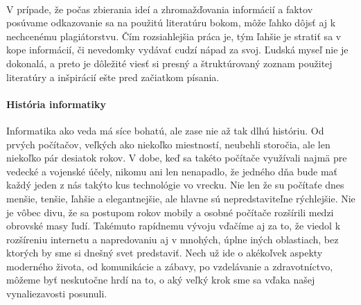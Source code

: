 \documentclass[10pt,twoside,slovak,a4paper]{article}
\begin{document}
\paragraph{} V prípade, že počas zbierania ideí a zhromažďovania informácií a faktov posúvame odkazovanie sa na použitú literatúru bokom, môže ľahko dôjsť aj k nechcenému plagiátorstvu. Čím rozsiahlejšia práca je, tým ľahšie je stratiť sa v kope informácií, či nevedomky vydávať cudzí nápad za svoj. Ľudská myseľ nie je dokonalá, a preto je dôležité viesť si presný a štruktúrovaný zoznam použitej literatúry a inšpirácií ešte pred začiatkom písania.

\paragraph{História informatiky} Informatika ako veda má síce bohatú, ale zase nie až tak dlhú históriu. Od prvých počítačov, veľkých ako niekoľko miestností, neubehli storočia, ale len niekoľko pár desiatok rokov. V dobe, keď sa takéto počítače využívali najmä pre vedecké a vojenské účely, nikomu ani len nenapadlo, že jedného dňa bude mať každý jeden z nás takýto kus technológie vo vrecku. Nie len že su počítaťe dnes menšie, tenšie, ľahšie a elegantnejšie, ale hlavne sú nepredstaviteľne rýchlejšie. Nie je vôbec divu, že sa postupom rokov mobily a osobné počítače rozšírili medzi obrovské masy ľudí. Takémuto rapídnemu vývoju vďačíme aj za to, že viedol k rozšíreniu internetu a napredovaniu aj v mnohých, úplne iných oblastiach, bez ktorých by sme si dnešný svet predstaviť. Nech už ide o akékoľvek aspekty moderného života, od komunikácie a zábavy, po vzdelávanie a zdravotníctvo, môžeme byť neskutočne hrdí na to, o aký veľký krok sme sa vďaka našej vynaliezavosti posunuli.





\end{document}
